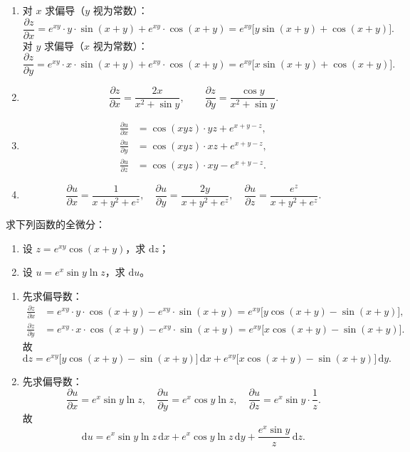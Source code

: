 \documentclass[answer]{THUExam}
\begin{document}
\begin{solution}
\begin{enumerate}
\item 对 $x$ 求偏导（$y$ 视为常数）：
\[
\frac{\partial z}{\partial x}=e^{xy}\cdot y\cdot\sin(x+y)+e^{xy}\cdot\cos(x+y)
=e^{xy}\big[y\sin(x+y)+\cos(x+y)\big].
\]
对 $y$ 求偏导（$x$ 视为常数）：
\[
\frac{\partial z}{\partial y}=e^{xy}\cdot x\cdot\sin(x+y)+e^{xy}\cdot\cos(x+y)
=e^{xy}\big[x\sin(x+y)+\cos(x+y)\big].
\]

\item
\[
\frac{\partial z}{\partial x}=\frac{2x}{x^2+\sin y},\qquad
\frac{\partial z}{\partial y}=\frac{\cos y}{x^2+\sin y}.
\]

\item
\begin{align*}
\frac{\partial u}{\partial x}&=\cos(xyz)\cdot yz+e^{x+y-z},\\[2pt]
\frac{\partial u}{\partial y}&=\cos(xyz)\cdot xz+e^{x+y-z},\\[2pt]
\frac{\partial u}{\partial z}&=\cos(xyz)\cdot xy-e^{x+y-z}.
\end{align*}

\item
\[
\frac{\partial u}{\partial x}=\frac{1}{x+y^2+e^z},\quad
\frac{\partial u}{\partial y}=\frac{2y}{x+y^2+e^z},\quad
\frac{\partial u}{\partial z}=\frac{e^z}{x+y^2+e^z}.
\]
\end{enumerate}
\end{solution}
\bigskip

\begin{problem}
求下列函数的全微分：
\begin{enumerate}
\item 设 $z=e^{xy}\cos(x+y)$，求 $\mathrm{d}z$；
\item 设 $u=e^x\sin y\ln z$，求 $\mathrm{d}u$。
\end{enumerate}
\end{problem}

\begin{solution}
\begin{enumerate}
\item 先求偏导数：
\begin{align*}
\frac{\partial z}{\partial x}&=e^{xy}\cdot y\cdot\cos(x+y)-e^{xy}\cdot\sin(x+y)
=e^{xy}\big[y\cos(x+y)-\sin(x+y)\big],\\[2pt]
\frac{\partial z}{\partial y}&=e^{xy}\cdot x\cdot\cos(x+y)-e^{xy}\cdot\sin(x+y)
=e^{xy}\big[x\cos(x+y)-\sin(x+y)\big].
\end{align*}
故
\[
\mathrm{d}z=e^{xy}\big[y\cos(x+y)-\sin(x+y)\big]\,\mathrm{d}x
        +e^{xy}\big[x\cos(x+y)-\sin(x+y)\big]\,\mathrm{d}y.
\]

\item 先求偏导数：
\[
\frac{\partial u}{\partial x}=e^x\sin y\ln z,\quad
\frac{\partial u}{\partial y}=e^x\cos y\ln z,\quad
\frac{\partial u}{\partial z}=e^x\sin y\cdot\frac{1}{z}.
\]
故
\[
\mathrm{d}u=e^x\sin y\ln z\,\mathrm{d}x+e^x\cos y\ln z\,\mathrm{d}y
        +\frac{e^x\sin y}{z}\,\mathrm{d}z.
\]
\end{enumerate}
\end{solution}
\bigskip
\end{document}
